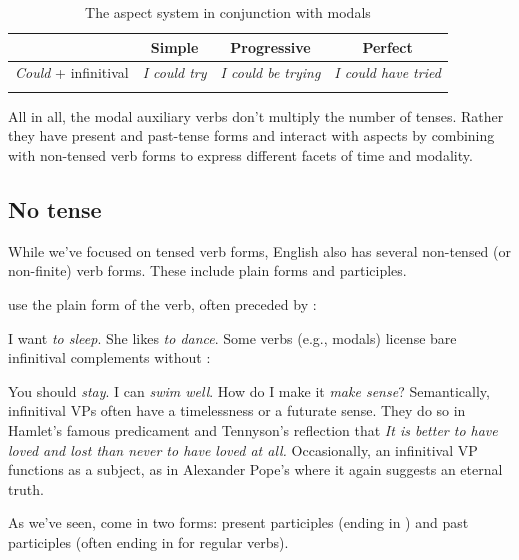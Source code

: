 \begin{table}
    \begin{tabular}{cccc}
        \lsptoprule
        & Simple & Progressive & Perfect \\
        \midrule
        \textit{Could} + infinitival &
        \textit{I could \emph{try}} &
        \textit{I could \emph{be trying}} &
        \textit{I could \emph{have tried}} \\
        \lspbottomrule
    \end{tabular}
    \caption{The aspect system in conjunction with modals}
    \label{tab:tense-modal}
\end{table}

All in all, the modal auxiliary verbs don't multiply the number of tenses. Rather they have present and past-tense forms and interact with aspects by combining with non-tensed verb forms to express different facets of time and modality.

\subsection{No tense}

While we've focused on tensed verb forms, English also has several non-tensed (or non-finite) verb forms. These include plain forms and participles.

\label{sec:infinitives} use the plain form of the verb, often preceded by :

\ea
\ea I want \emph{to sleep}.
\ex She likes \emph{to dance}.
\z\z
\noindent Some verbs (e.g., modals) license bare infinitival complements without :

\ea
\ea You should \emph{stay}.
\ex I can \emph{swim well}.
\ex How do I make it \emph{make sense}?
\z\z
Semantically, infinitival VPs often have a timelessness or a futurate sense. They do so in Hamlet's famous predicament  and Tennyson's reflection that \textit{It is better to have loved and lost than never to have loved at all.} Occasionally, an infinitival VP functions as a subject, as in Alexander Pope's  where it again suggests an eternal truth.

\bigskip

As we've seen,  come in two forms: present participles (ending in ) and past participles (often ending in  for regular verbs). 

